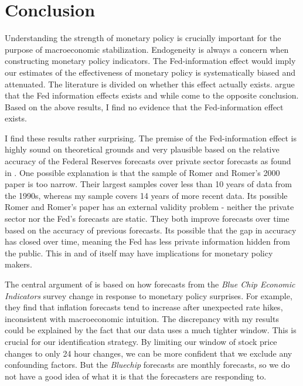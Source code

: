 \documentclass[a4paper,man,floatsintext,natbib]{apa6}
\begin{document}
	\section{Conclusion} 
		Understanding the strength of monetary policy is crucially important for the purpose of macroeconomic stabilization. Endogeneity is always a concern when constructing monetary policy indicators. The Fed-information effect would imply our estimates of the effectiveness of monetary policy is systematically biased and attenuated. The literature is divided on whether this effect actually exists. \cite{Nakamura2018} argue that the Fed information effects exists and while \cite{Bauer2020} come to the opposite conclusion. Based on the above results, I find no evidence that the Fed-information effect exists.
		
		I find these results rather surprising. The premise of the Fed-information effect is highly sound on theoretical grounds and very plausible based on the relative accuracy of the Federal Reserves forecasts over private sector forecasts as found in \cite{Romer2000}. One possible explanation is that the sample of Romer and Romer's 2000 paper is too narrow. Their largest samples cover less than 10 years of data from the 1990s, whereas my sample covers 14 years of more recent data. Its possible Romer and Romer's paper has an external validity problem - neither the private sector nor the Fed's forecasts are static. They both improve forecasts over time based on the accuracy of previous forecasts. Its possible that the gap in accuracy has closed over time, meaning the Fed has less private information hidden from the public. This in and of itself may have implications for monetary policy makers.
		
		The central argument of \cite{Nakamura2018} is based on how forecasts from the \textit{Blue Chip Economic Indicators} survey change in response to monetary policy surprises. For example, they find that inflation forecasts tend to increase after unexpected rate hikes, inconsistent with macroeconomic intuition. The discrepancy with my results could be explained by the fact that our data uses a much tighter window. This is crucial for our identification strategy. By limiting our window of stock price changes to only 24 hour changes, we can be more confident that we exclude any confounding factors. But the \textit{Bluechip} forecasts are monthly forecasts, so we do not have a good idea of what it is that the forecasters are responding to. 
		
\end{document}
